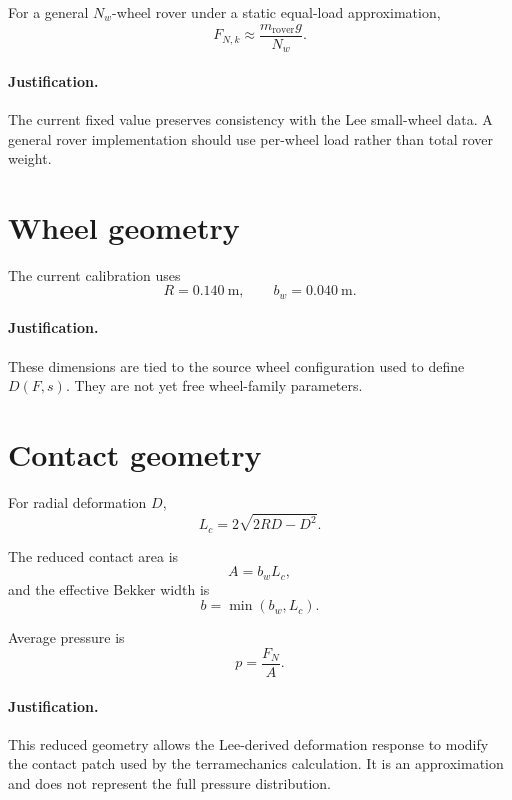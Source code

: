 \documentclass[11pt]{article}
\begin{document}
For a general $N_w$-wheel rover under a static equal-load approximation,
\begin{equation}
F_{N,k}\approx\frac{m_{\mathrm{rover}}g}{N_w}.
\end{equation}

\paragraph{Justification.}
The current fixed value preserves consistency with the Lee small-wheel data. A general rover implementation should use per-wheel load rather than total rover weight.

\section{Wheel geometry}

The current calibration uses
\begin{equation}
R=0.140~\mathrm{m},
\qquad
b_w=0.040~\mathrm{m}.
\end{equation}

\paragraph{Justification.}
These dimensions are tied to the source wheel configuration used to define $D(F,s)$. They are not yet free wheel-family parameters.

\section{Contact geometry}

For radial deformation $D$,
\begin{equation}
L_c=2\sqrt{2RD-D^2}.
\end{equation}

The reduced contact area is
\begin{equation}
A=b_wL_c,
\end{equation}
and the effective Bekker width is
\begin{equation}
b=\min(b_w,L_c).
\end{equation}

Average pressure is
\begin{equation}
p=\frac{F_N}{A}.
\end{equation}

\paragraph{Justification.}
This reduced geometry allows the Lee-derived deformation response to modify the contact patch used by the terramechanics calculation. It is an approximation and does not represent the full pressure distribution.
\end{document}
